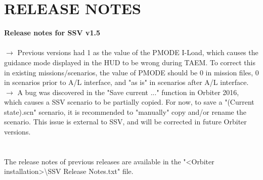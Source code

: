 \documentclass[Space_Shuttle_Vessel_Manual.tex]{subfiles}
\begin{document}
\section{RELEASE NOTES}
\label{sec:release-notes}
\noindent
\textbf{Release notes for SSV v1.5}\\\\
$\rightarrow$ Previous versions had 1 as the value of the PMODE I-Load, which causes the guidance mode displayed in the HUD to be wrong during TAEM. To correct this in existing missions/scenarios, the value of PMODE should be 0 in mission files, 0 in scenarios prior to A/L interface, and "as is" in scenarios after A/L interface.\\
$\rightarrow$ A bug was discovered in the "Save current ..." function in Orbiter 2016, which causes a SSV scenario to be partially copied. For now, to save a "(Current state).scn" scenario, it is recommended to "manually" copy and/or rename the scenario. This issue is external to SSV, and will be corrected in future Orbiter versions.\\
\\
\\
The release notes of previous releases are available in the "<Orbiter installation>\textbackslash SSV Release Notes.txt" file.
\end{document}

